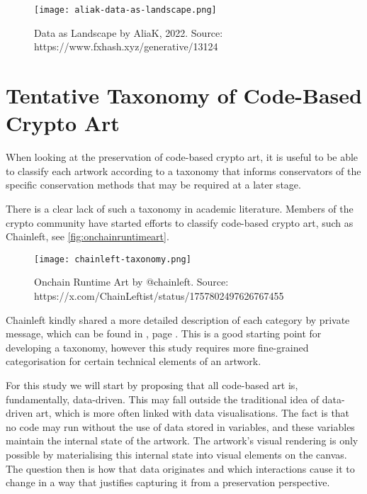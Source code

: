 

\begin{figure}[h]
    \centering
    \captionsetup{justification=centering}
    \texttt{[image: aliak-data-as-landscape.png]}
    \caption[Data as Landscape by AliaK]{Data as Landscape by AliaK, 2022. Source: https://www.fxhash.xyz/generative/13124}
    \label{fig:aliak-data-as-landscape}
\end{figure}



\section{Tentative Taxonomy of Code-Based Crypto Art}
\label{sec:interactivity}

When looking at the preservation of code-based crypto art, it is useful to be able to classify each artwork according to a taxonomy that informs conservators of the specific conservation methods that may be required at a later stage.

There is a clear lack of such a taxonomy in academic literature. Members of the crypto community have started efforts to classify code-based crypto art, such as Chainleft, see \autoref{fig:onchainruntimeart}.

\begin{figure}[h]
    \centering
    \captionsetup{justification=centering}
    \texttt{[image: chainleft-taxonomy.png]}
    \caption[Onchain Runtime Art]{Onchain Runtime Art by @chainleft. Source: https://x.com/ChainLeftist/status/1757802497626767455}
    \label{fig:onchainruntimeart}
\end{figure}

Chainleft kindly shared a more detailed description of each category by private message, which can be found in , page \pageref{appx:chainleft-taxonomy}. This is a good starting point for developing a taxonomy, however this study requires more fine-grained categorisation for certain technical elements of an artwork. 

For this study we will start by proposing that all code-based art is, fundamentally, data-driven. This may fall outside the traditional idea of data-driven art, which is more often linked with data visualisations. The fact is that no code may run without the use of data stored in variables, and these variables maintain the internal state of the artwork. The artwork's visual rendering is only possible by materialising this internal state into visual elements on the canvas. The question then is how that data originates and which interactions cause it to change in a way that justifies capturing it from a preservation perspective.


